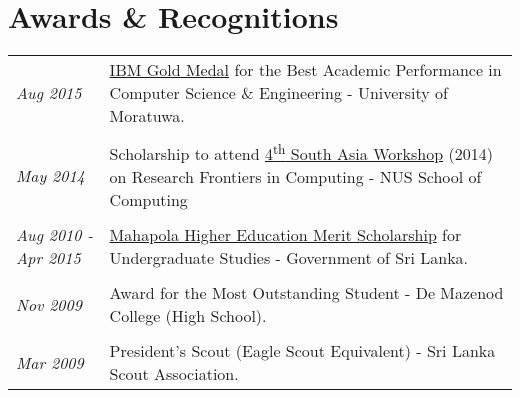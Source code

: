 \documentclass[a4paper,10pt]{article}
\begin{document}




\section{Awards \& Recognitions}
\begin{tabular}{p{3cm}p{13.5cm}}
\emph{Aug 2015} & \href{https://goo.gl/Q3SrQX}{IBM Gold Medal} for the Best Academic Performance in Computer Science \& Engineering - University of Moratuwa.\\\\
\emph{May 2014} & Scholarship to attend \href{https://goo.gl/lDpCe5}{4\textsuperscript{th} South Asia Workshop} (2014) on Research Frontiers in Computing - NUS School of Computing\\\\
\emph{Aug 2010 - Apr 2015} & \href{http://www.gic.gov.lk/gic/index.php?option=com_info&id=1644&task=info&lang=en}{Mahapola Higher Education Merit Scholarship} for Undergraduate Studies - Government of Sri Lanka.\\\\
\emph{Nov 2009} & Award for the Most Outstanding Student - De Mazenod College (High School).\\\\
\emph{Mar 2009} & President’s Scout (Eagle Scout Equivalent) - Sri Lanka Scout Association.\\
\end{tabular}\\
\end{document}
